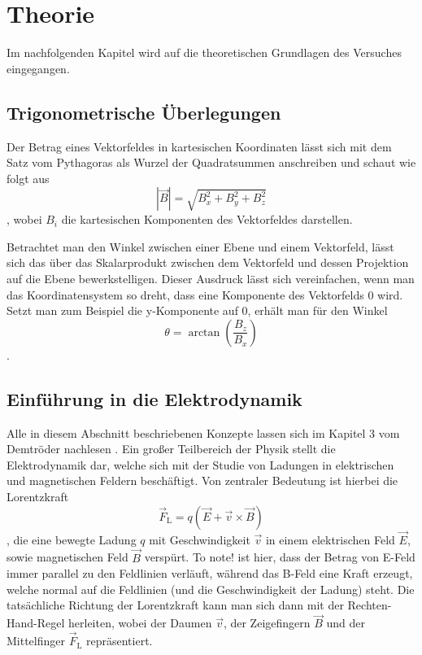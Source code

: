 \section{Theorie}
\label{sec:theorie}
Im nachfolgenden Kapitel wird auf die theoretischen Grundlagen des Versuches eingegangen.

\subsection{Trigonometrische Überlegungen}
Der Betrag eines Vektorfeldes in kartesischen Koordinaten lässt sich mit dem Satz vom Pythagoras als Wurzel der Quadratsummen anschreiben und schaut wie folgt aus
\begin{equation}\label{eqn:Babs}
	|\vec{B}| = \sqrt{B_x^2 + B_y^2 + B_z^2}
\end{equation}
, wobei \( B_i \) die kartesischen Komponenten des Vektorfeldes darstellen.

Betrachtet man den Winkel zwischen einer Ebene und einem Vektorfeld, lässt sich das über das Skalarprodukt zwischen dem Vektorfeld und dessen Projektion auf die Ebene bewerkstelligen. Dieser Ausdruck lässt sich vereinfachen, wenn man das Koordinatensystem so dreht, dass eine Komponente des Vektorfelds 0 wird. Setzt man zum Beispiel die y-Komponente auf 0, erhält man für den Winkel 
\begin{equation}\label{eqn:theta}
	\theta = \arctan(\frac{B_z}{B_x})
\end{equation}
.

\subsection{Einführung in die Elektrodynamik}
Alle in diesem Abschnitt beschriebenen Konzepte lassen sich im Kapitel 3 vom Demtröder nachlesen \cite{demtröder}.
Ein großer Teilbereich der Physik stellt die Elektrodynamik dar, welche sich mit der Studie von Ladungen in elektrischen und magnetischen Feldern beschäftigt. Von zentraler Bedeutung ist hierbei die Lorentzkraft 
\begin{equation}\label{eqn:FL}
	\vec{F}_{\text{L}} = q\left(\vec{E} + \vec{v} \times \vec{B}\right)
\end{equation}
, die eine bewegte Ladung \( q \) mit Geschwindigkeit \( \vec{v} \) in einem elektrischen Feld \( \vec{E} \), sowie magnetischen Feld \( \vec{B} \) verspürt. To note! ist hier, dass der Betrag von E-Feld immer parallel zu den Feldlinien verläuft, während das B-Feld eine Kraft erzeugt, welche normal auf die Feldlinien (und die Geschwindigkeit der Ladung) steht. Die tatsächliche Richtung der Lorentzkraft kann man sich dann mit der Rechten-Hand-Regel herleiten, wobei der Daumen \( \vec{v} \), der Zeigefingern \( \vec{B} \) und der Mittelfinger \( \vec{F}_{\text{L}} \) repräsentiert. 


